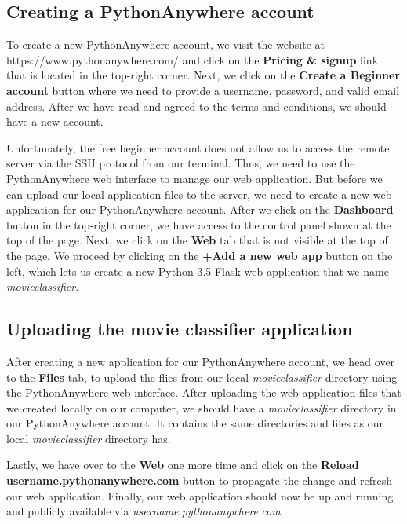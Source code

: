 \documentclass[11pt]{article}
\begin{document}
    \subsection{Creating a PythonAnywhere
account}\label{creating-a-pythonanywhere-account}

    To create a new PythonAnywhere account, we visit the website at
https://www.pythonanywhere.com/ and click on the \textbf{Pricing \&
signup} link that is located in the top-right corner. Next, we click on
the \textbf{Create a Beginner account} button where we need to provide a
username, password, and valid email address. After we have read and
agreed to the terms and conditions, we should have a new account.

Unfortunately, the free beginner account does not allow us to access the
remote server via the SSH protocol from our terminal. Thus, we need to
use the PythonAnywhere web interface to manage our web application. But
before we can upload our local application files to the server, we need
to create a new web application for our PythonAnywhere account. After we
click on the \textbf{Dashboard} button in the top-right corner, we have
access to the control panel shown at the top of the page. Next, we click
on the \textbf{Web} tab that is not visible at the top of the page. We
proceed by clicking on the \textbf{+Add a new web app} button on the
left, which lets us create a new Python 3.5 Flask web application that
we name \emph{movieclassifier}.

    \subsection{Uploading the movie classifier
application}\label{uploading-the-movie-classifier-application}

    After creating a new application for our PythonAnywhere account, we head
over to the \textbf{Files} tab, to upload the flies from our local
\emph{movieclassifier} directory using the PythonAnywhere web interface.
After uploading the web application files that we created locally on our
computer, we should have a \emph{movieclassifier} directory in our
PythonAnywhere account. It contains the same directories and files as
our local \emph{movieclassifier} directory has.

Lastly, we have over to the \textbf{Web} one more time and click on the
\textbf{Reload username.pythonanywhere.com} button to propagate the
change and refresh our web application. Finally, our web application
should now be up and running and publicly available via
\emph{username.pythonanywhere.com}.
\end{document}
